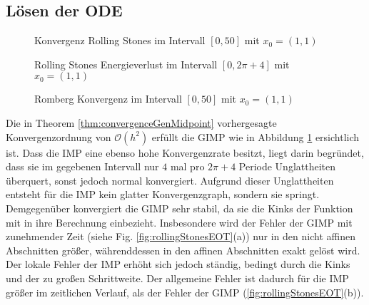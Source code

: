 \subsection{Lösen der ODE}
\begin{figure}
\centering

\caption{Konvergenz Rolling Stones im Intervall $[0,50]$ mit $x_0=(1,1)$}
\label{fig:rollingStonesConvergence}
\end{figure}


\begin{figure}[H]
\footnotesize 
\centering
\begin{minipage}[b]{0.45\linewidth}

\caption{Rolling Stones Energieverlust im Intervall $[0,2\pi+4]$ mit $x_0=(1,1)$}
\label{fig:rollingStonesEnergyError}
\end{minipage}
\quad
\begin{minipage}[b]{0.45\linewidth}

\caption{Romberg Konvergenz im Intervall $[0,50]$ mit $x_0=(1,1)$}
\label{fig:rollingStonesConvergenceRomberg}
\end{minipage}

\end{figure}


Die in Theorem \ref{thm:convergenceGenMidpoint} vorhergesagte Konvergenzordnung von $\mathcal O(h^2)$ erfüllt die GIMP wie in Abbildung \ref{fig:rollingStonesConvergence} ersichtlich ist.
Dass die IMP eine ebenso hohe Konvergenzrate besitzt, liegt darin begründet, dass sie im gegebenen Intervall nur $4$ mal pro $2\pi+4$ Periode Unglattheiten überquert, sonst jedoch normal konvergiert. Aufgrund dieser Unglattheiten entsteht für die IMP kein glatter Konvergenzgraph, sondern sie springt. Demgegenüber konvergiert die GIMP sehr stabil, da sie die Kinks der Funktion mit in ihre Berechnung einbezieht.
Insbesondere wird der Fehler der GIMP mit zunehmender Zeit (siehe Fig. \ref{fig:rollingStonesEOT}(a)) nur in den nicht affinen Abschnitten größer, währenddessen in den affinen Abschnitten exakt gelöst wird. Der lokale Fehler der IMP erhöht sich jedoch ständig, bedingt durch die Kinks und der zu großen Schrittweite. Der allgemeine Fehler ist dadurch für die IMP größer im zeitlichen Verlauf, als der Fehler der GIMP (\ref{fig:rollingStonesEOT}(b)).

